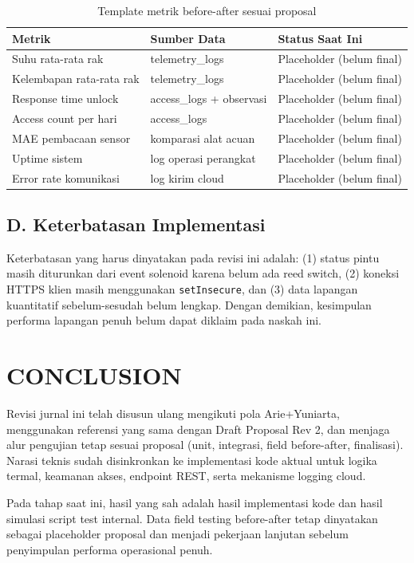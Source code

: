 \documentclass[10pt,a4paper,twocolumn]{article}
\begin{document}
\begin{table}[h]
\centering
\caption{Template metrik before-after sesuai proposal}
\label{tab:fieldtemplate}
\begin{tabularx}{0.98\columnwidth}{p{}p{}Y}
\toprule
\textbf{Metrik} & \textbf{Sumber Data} & \textbf{Status Saat Ini} \\\midrule
Suhu rata-rata rak & telemetry\_logs & Placeholder (belum final) \\
Kelembapan rata-rata rak & telemetry\_logs & Placeholder (belum final) \\
Response time unlock & access\_logs + observasi & Placeholder (belum final) \\
Access count per hari & access\_logs & Placeholder (belum final) \\
MAE pembacaan sensor & komparasi alat acuan & Placeholder (belum final) \\
Uptime sistem & log operasi perangkat & Placeholder (belum final) \\
Error rate komunikasi & log kirim cloud & Placeholder (belum final) \\
\bottomrule
\end{tabularx}
\end{table}

\subsection*{D. Keterbatasan Implementasi}
Keterbatasan yang harus dinyatakan pada revisi ini adalah: (1) status pintu masih diturunkan dari event solenoid karena belum ada reed switch, (2) koneksi HTTPS klien masih menggunakan \texttt{setInsecure}, dan (3) data lapangan kuantitatif sebelum-sesudah belum lengkap. Dengan demikian, kesimpulan performa lapangan penuh belum dapat diklaim pada naskah ini.

\section{CONCLUSION}
Revisi jurnal ini telah disusun ulang mengikuti pola Arie+Yuniarta, menggunakan referensi yang sama dengan Draft Proposal Rev 2, dan menjaga alur pengujian tetap sesuai proposal (unit, integrasi, field before-after, finalisasi). Narasi teknis sudah disinkronkan ke implementasi kode aktual untuk logika termal, keamanan akses, endpoint REST, serta mekanisme logging cloud.

Pada tahap saat ini, hasil yang sah adalah hasil implementasi kode dan hasil simulasi script test internal. Data field testing before-after tetap dinyatakan sebagai placeholder proposal dan menjadi pekerjaan lanjutan sebelum penyimpulan performa operasional penuh.



\end{document}
